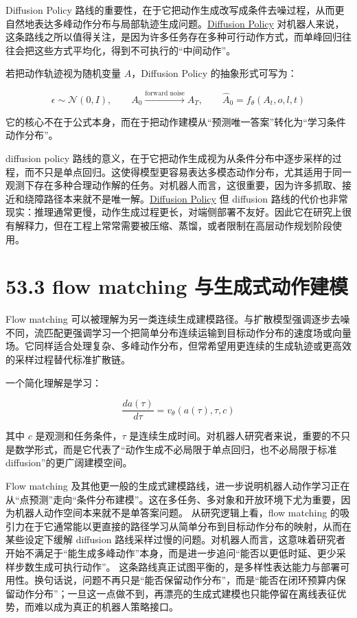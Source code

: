 Diffusion Policy 路线的重要性，在于它把动作生成改写成条件去噪过程，从而更自然地表达多峰动作分布与局部轨迹生成问题。\href{https://arxiv.org/abs/2303.04137}{Diffusion Policy} 对机器人来说，这条路线之所以值得关注，是因为许多任务存在多种可行动作方式，而单峰回归往往会把这些方式平均化，得到不可执行的“中间动作”。

若把动作轨迹视为随机变量 \(A\)，Diffusion Policy 的抽象形式可写为：

\begingroup
\scriptsize
\begin{equation*}
\epsilon \sim \mathcal{N}(0, I), \qquad
A_0 \xrightarrow{\text{forward noise}} A_T, \qquad
\hat{A}_0 = f_\theta(A_t, o, l, t)
\end{equation*}
\endgroup

它的核心不在于公式本身，而在于把动作建模从“预测唯一答案”转化为“学习条件动作分布”。

diffusion policy 路线的意义，在于它把动作生成视为从条件分布中逐步采样的过程，而不只是单点回归。这使得模型更容易表达多模态动作分布，尤其适用于同一观测下存在多种合理动作解的任务。对机器人而言，这很重要，因为许多抓取、接近和绕障路径本来就不是唯一解。\href{https://arxiv.org/abs/2303.04137}{Diffusion Policy} 但 diffusion 路线的代价也非常现实：推理通常更慢，动作生成过程更长，对端侧部署不友好。因此它在研究上很有解释力，但在工程上常常需要被压缩、蒸馏，或者限制在高层动作规划阶段使用。

\section*{53.3 flow matching 与生成式动作建模}


Flow matching 可以被理解为另一类连续生成建模路径。与扩散模型强调逐步去噪不同，流匹配更强调学习一个把简单分布连续运输到目标动作分布的速度场或向量场。它同样适合处理复杂、多峰动作分布，但常希望用更连续的生成轨迹或更高效的采样过程替代标准扩散链。

一个简化理解是学习：

\begin{equation*}
\frac{d a(\tau)}{d\tau} = v_\theta(a(\tau), \tau, c)
\end{equation*}

其中 \(c\) 是观测和任务条件，\(\tau\) 是连续生成时间。对机器人研究者来说，重要的不只是数学形式，而是它代表了“动作生成不必局限于单点回归，也不必局限于标准 diffusion”的更广阔建模空间。

Flow matching 及其他更一般的生成式建模路线，进一步说明机器人动作学习正在从“点预测”走向“条件分布建模”。这在多任务、多对象和开放环境下尤为重要，因为机器人动作空间本来就不是单答案问题。 从研究逻辑上看，flow matching 的吸引力在于它通常能以更直接的路径学习从简单分布到目标动作分布的映射，从而在某些设定下缓解 diffusion 路线采样过慢的问题。对机器人而言，这意味着研究者开始不满足于“能生成多峰动作”本身，而是进一步追问“能否以更低时延、更少采样步数生成可执行动作”。 这条路线真正试图平衡的，是多样性表达能力与部署可用性。换句话说，问题不再只是“能否保留动作分布”，而是“能否在闭环预算内保留动作分布”；一旦这一点做不到，再漂亮的生成式建模也只能停留在离线表征优势，而难以成为真正的机器人策略接口。

